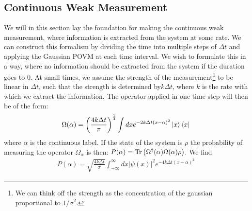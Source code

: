 \subsection{Continuous Weak Measurement}\label{sec:continuous_weak_measurement}
We will in this section lay the foundation for making the continuous weak measurement, where information is extracted from the system at some rate. We can construct this formalism by dividing the time into multiple steps of $\Delta t$ and applying the Gaussian POVM at each time interval. We wish to formulate this in a way, where no information should be extracted from the system if the duration goes to $0$. At small times, we assume the strength of the measurement\footnote{We can think off the strength as the concentration of the gaussian proportional to $1/\sigma^2$.} to be linear in $\Delta t$, such that the strength is determined by$k\Delta t$, where $k$ is the rate with which we extract the information. The operator applied in one time step will then be of the form:
\begin{equation}
    \Omega(\alpha) = \left(\frac{4 k \Delta t}{\pi}\right)^\frac14 \int dx e^{-2k\Delta t (x - \alpha)^2} \ket{x}\bra{x}
\end{equation}
where $\alpha$ is the continuous label. If the state of the system is $\rho$ the probability of measuring the operator $\Omega_\alpha$ is then: $P(\alpha) = \Tr\left(\Omega^\dagger(\alpha) \Omega(\alpha) \rho \right)$. We find %
\begin{align}
    P(\alpha) = \sqrt{\frac{4 k \Delta t}{\pi}} \int_{-\infty}^{\infty} dx |\psi(x)|^2 e^{-4k\Delta t (x - \alpha)^2}
\end{align}
